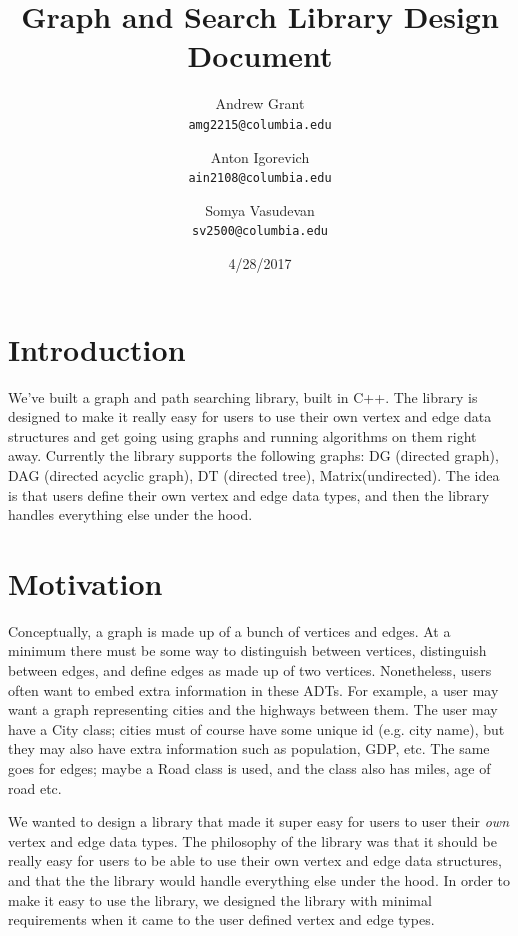 \documentclass{article}
\title{Graph and Search Library Design Document}
\author{
Andrew Grant\\
\texttt{amg2215@columbia.edu}
\and 
Anton Igorevich \\
\texttt{ain2108@columbia.edu}
\and
 Somya Vasudevan \\
 \texttt{sv2500@columbia.edu}
}
\date{4/28/2017}
\begin{document}
\maketitle

\section{Introduction}
We've built a graph and path searching library, built in C++. The library is designed to make it really easy for users to use their own vertex and edge data structures and get going using graphs and running algorithms on them right away. Currently the library supports the following graphs: DG (directed graph), DAG (directed acyclic graph), DT (directed tree), Matrix(undirected). The idea is that users define their own vertex and edge data types, and then the library handles everything else under the hood.

\section{Motivation}
Conceptually, a graph is made up of a bunch of vertices and edges. At a minimum there must be some way to distinguish between vertices, distinguish between edges, and define edges as made up of two vertices. Nonetheless, users often want to embed extra information in these ADTs. For example, a user may want a graph representing cities and the highways between them. The user may have a City class; cities must of course have some unique id (e.g. city name), but they may also have extra information such as population, GDP, etc. The same goes for edges; maybe a Road class is used, and the class also has miles, age of road etc. 
\par
We wanted to design a library that made it super easy for users to user their \emph{own} vertex and edge data types.
The philosophy of the library was that it should be really easy for users to be able to use their own vertex and edge data structures, and that the the library would handle everything else under the hood. In order to make it easy to use the library, we designed the library with minimal requirements when it came to the user defined vertex and edge types. 
\end{document}
